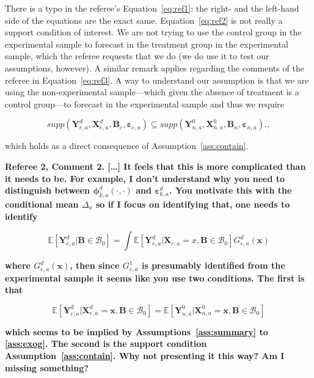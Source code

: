 There is a typo in the referee's Equation~\eqref{eq:ref1}: the right- and the left-hand side of the equations are the exact same. Equation~\eqref{eq:ref2} is not really a support condition of interest. We are not trying to use the control group in the experimental sample to forecast in the treatment group in the experimental sample, which the referee requests that we do (we do use it to test our assumptions, however). A similar remark applies regarding the comments of the referee in Equation~\eqref{eq:ref3}. A way to understand our assumption is that we are using the non-experimental sample---which given the absence of treatment is a control group---to forecast in the experimental sample and thus we require

\begin{equation}
supp( \bm{Y}_{e,a}^d, \bm{X}^d_{e,a}, \bm{B}_e, \bm{\varepsilon}_{e,a} ) \subseteq supp( \bm{Y}_{n,a}^0, \bm{X}^0_{n,a}, \bm{B}_n, \bm{\varepsilon}_{n,a} ).  \label{eq:ref4},
\end{equation}

which holds as a direct consequence of Assumption~\ref{ass:contain}. 

\noindent \textbf{Referee 2, Comment 2. [\ldots] It feels that this is more complicated than it needs to be. For example, I don't understand why you need to distinguish between $\bm{\phi}_{k,a}^d \left( \cdot, \cdot \right) $ and $\bm{\varepsilon}_{k,a}^d$. You motivate this with the conditional mean $\Delta_a$ so if I focus on identifying that, one needs to identify}

\begin{equation}
\mathbb{E} \left[ \bm{Y}_{e,a}^d | \bm{B} \in \mathcal{B}_0 \right] = \int \mathbb{E} \left[ \bm{Y}_{e,a}^d | \bm{X}_{e,a} = x, \bm{B} \in \mathcal{B}_0 \right] G_{e,a}^d \left( \bm{x} \right)
\end{equation}

\textbf{where $G_{e,a}^d \left( \bm{x} \right)$, then since $G_{e,a}^1$ is presumably identified from the experimental sample it seems like you use two conditions. The first is that}

\begin{equation}
\mathbb{E} \left[  \bm{Y}_{e,a}^d | \bm{X}_{e,a}^d = \bm{x},  \bm{B} \in \mathcal{B}_0 \right] = \mathbb{E} \left[  \bm{Y}_{n,a}^0 | \bm{X}_{n,a}^0 = \bm{x},  \bm{B} \in \mathcal{B}_0 \right]  \label{eq:ref4}
\end{equation}

\textbf{which seems to be implied by Assumptions~\ref{ass:summary} to \ref{ass:exog}. The second is the support condition Assumption~\ref{ass:contain}. Why not presenting it this way? Am I missing something?}

